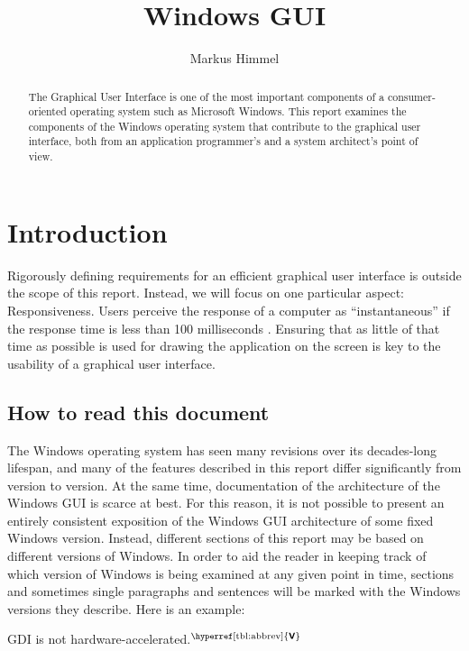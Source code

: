 \documentclass[10pt,twocolumn,a4paper]{article}
\author{Markus Himmel}
\title{Windows GUI}
\newcommand{\bs}[1]{\textbf{\sffamily #1}}
\newcommand{\winver}[1]{$^{\text{\hyperref[tbl:abbrev]{\bs{#1}}}}$}
\begin{document}
	\maketitle

	\begin{abstract}
		The Graphical User Interface is one of the most important components
		of a consumer-oriented operating system such as Microsoft Windows. This
		report examines the components of the Windows operating system that
		contribute to the graphical user interface, both from an application
		programmer's and a system architect's point of view. %
	\end{abstract}

	\section{Introduction}

		Rigorously defining requirements for an efficient graphical user
		interface is outside the scope of this report. Instead, we will focus
		on one particular aspect: Responsiveness. Users perceive the response
		of a computer as \enquote{instantaneous} if the response time is less
		than 100 milliseconds \cite{miller1968response}. Ensuring that as
		little of that time as possible is used for drawing the application on
		the screen is key to the usability of a graphical user interface.

		\subsection{How to read this document}
			The Windows operating system has seen many revisions over its
			decades-long lifespan, and many of the features described in this
			report differ significantly from version to version. At the same
			time, documentation of the architecture of the Windows GUI is
			scarce at best.  For this reason, it is not possible to present an
			entirely consistent exposition of the Windows GUI architecture of
			some fixed Windows version.  Instead, different sections of this
			report may be based on different versions of Windows. In order to
			aid the reader in keeping track of which version of Windows is
			being examined at any given point in time, sections and sometimes
			single paragraphs and sentences will be marked with the Windows
			versions they describe. Here is an example:

			\vspace{1em}
			GDI is not hardware-accelerated.\winver{V}
			\vspace{1em}
\end{document}
